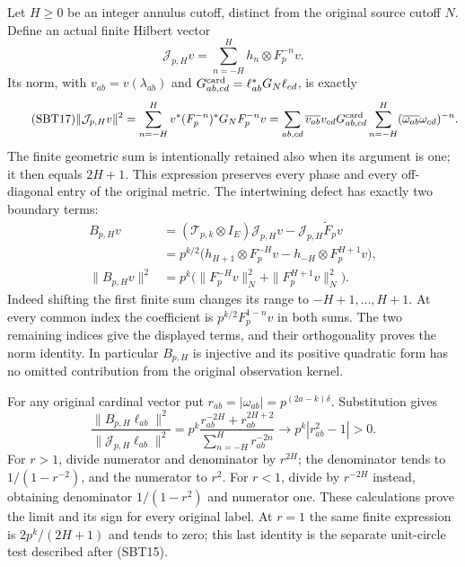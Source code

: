 \documentclass[11pt]{article}
\begin{document}
Let $H\ge0$ be an integer annulus cutoff, distinct from the original
source cutoff $N$. Define an actual finite Hilbert vector
\begin{equation}\tag{SBT16}
 \mathcal J_{p,H}v=\sum_{n=-H}^{H}h_n\otimes F_p^{-n}v.
\end{equation}
Its norm, with $v_{ab}=v(\lambda_{ab})$ and
$G_{ab,cd}^{\rm card}=\ell_{ab}^*G_N\ell_{cd}$, is exactly
\begin{equation}\tag{SBT17}
 \|\mathcal J_{p,H}v\|^2
 =\sum_{n=-H}^{H}v^*(F_p^{-n})^*G_NF_p^{-n}v
 =\sum_{ab,cd}\overline{v_{ab}}v_{cd}G_{ab,cd}^{\rm card}
     \sum_{n=-H}^{H}(\overline{\omega_{ab}}\omega_{cd})^{-n}.
\end{equation}
The finite geometric sum is intentionally retained also when its
argument is one; it then equals $2H+1$. This expression preserves
every phase and every off-diagonal entry of the original metric.
The intertwining defect has exactly two boundary terms:
\begin{equation}\tag{SBT18}
 \begin{split}
 B_{p,H}v&=(\mathscr T_{p,k}\otimes I_E)\mathcal J_{p,H}v
                       -\mathcal J_{p,H}\widetilde F_pv\\
 &=p^{k/2}\bigl(h_{H+1}\otimes F_p^{-H}v
                      -h_{-H}\otimes F_p^{H+1}v\bigr),\\
 \|B_{p,H}v\|^2
 &=p^k\bigl(\|F_p^{-H}v\|_N^2+\|F_p^{H+1}v\|_N^2\bigr).
 \end{split}
\end{equation}
Indeed shifting the first finite sum changes its range to
$-H+1,\ldots,H+1$. At every common index the coefficient is
$p^{k/2}F_p^{1-n}v$ in both sums. The two remaining indices give the
displayed terms, and their orthogonality proves the norm identity.
In particular $B_{p,H}$ is injective and its positive quadratic form
has no omitted contribution from the original observation kernel.

For any original cardinal vector put
$r_{ab}=|\omega_{ab}|=p^{(2a-k)\delta}$. Substitution gives
\begin{equation}\tag{SBT19}
 \frac{\|B_{p,H}\ell_{ab}\|^2}
      {\|\mathcal J_{p,H}\ell_{ab}\|^2}
   =p^k\frac{r_{ab}^{-2H}+r_{ab}^{2H+2}}
                {\sum_{n=-H}^{H}r_{ab}^{-2n}}
   \longrightarrow p^k|r_{ab}^2-1|>0 .
\end{equation}
For $r>1$, divide numerator and denominator by $r^{2H}$;
the denominator tends to $1/(1-r^{-2})$, and the numerator to $r^2$.
For $r<1$, divide by $r^{-2H}$ instead, obtaining denominator
$1/(1-r^2)$ and numerator one. These calculations prove the limit
and its sign for every original label. At $r=1$ the same finite
expression is $2p^k/(2H+1)$ and tends to zero; this last identity is
the separate unit-circle test described after (SBT15).
\end{document}
